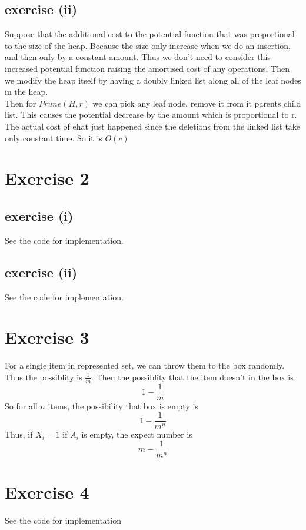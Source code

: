 \documentclass[12pt,oneside,a4paper]{article}
\begin{document}
\subsection{exercise (ii)}
Suppose that the additional cost to the potential function that was proportional to the size of the heap. Because the size only increase
when we do an insertion, and then only by a constant amount. Thus we don't need to consider this increased potential function raising
the amortised cost of any operations. Then we modify the heap itself  by having a doubly linked list along all of the leaf nodes in the heap.\\
Then for $Prune(H,r)$ we can pick any leaf node, remove it from it parents child list. This causes the potential decrease by the amount which 
is proportional to r. The actual cost of ehat just happened since the deletions from the linked list take only constant time.
So it is $O(c)$
\section{Exercise 2}
\subsection{exercise (i)}
See the code for implementation.
\subsection{exercise (ii)}
See the code for implementation.
\section{Exercise 3}

For a single item in represented set, we can throw them to the box randomly. Thus the possiblity is $\frac{1}{m}$. Then the possiblity that 
the item doesn't in the box is 
$$
1-\frac{1}{m}
$$
So for all $n$ items, the possibility that box is empty is 
$$
1-\frac{1}{m^n}
$$
Thus, if $X_i=1$ if $A_i$ is empty, the expect number is 
$$
m-\frac{1}{m^n}
$$ 
\section{Exercise 4}
See the code for implementation
\end{document}
